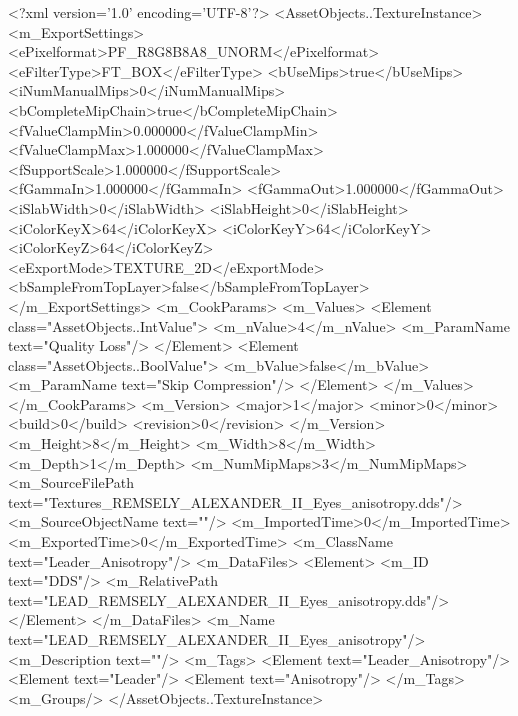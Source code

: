 <?xml version='1.0' encoding='UTF-8'?>
<AssetObjects..TextureInstance>
  <m_ExportSettings>
    <ePixelformat>PF_R8G8B8A8_UNORM</ePixelformat>
    <eFilterType>FT_BOX</eFilterType>
    <bUseMips>true</bUseMips>
    <iNumManualMips>0</iNumManualMips>
    <bCompleteMipChain>true</bCompleteMipChain>
    <fValueClampMin>0.000000</fValueClampMin>
    <fValueClampMax>1.000000</fValueClampMax>
    <fSupportScale>1.000000</fSupportScale>
    <fGammaIn>1.000000</fGammaIn>
    <fGammaOut>1.000000</fGammaOut>
    <iSlabWidth>0</iSlabWidth>
    <iSlabHeight>0</iSlabHeight>
    <iColorKeyX>64</iColorKeyX>
    <iColorKeyY>64</iColorKeyY>
    <iColorKeyZ>64</iColorKeyZ>
    <eExportMode>TEXTURE_2D</eExportMode>
    <bSampleFromTopLayer>false</bSampleFromTopLayer>
  </m_ExportSettings>
  <m_CookParams>
    <m_Values>
      <Element class="AssetObjects..IntValue">
        <m_nValue>4</m_nValue>
        <m_ParamName text="Quality Loss"/>
      </Element>
      <Element class="AssetObjects..BoolValue">
        <m_bValue>false</m_bValue>
        <m_ParamName text="Skip Compression"/>
      </Element>
    </m_Values>
  </m_CookParams>
  <m_Version>
    <major>1</major>
    <minor>0</minor>
    <build>0</build>
    <revision>0</revision>
  </m_Version>
  <m_Height>8</m_Height>
  <m_Width>8</m_Width>
  <m_Depth>1</m_Depth>
  <m_NumMipMaps>3</m_NumMipMaps>
  <m_SourceFilePath text="Textures\LEAD_REMSELY_ALEXANDER_II_Eyes_anisotropy.dds"/>
  <m_SourceObjectName text=""/>
  <m_ImportedTime>0</m_ImportedTime>
  <m_ExportedTime>0</m_ExportedTime>
  <m_ClassName text="Leader_Anisotropy"/>
  <m_DataFiles>
    <Element>
      <m_ID text="DDS"/>
      <m_RelativePath text="LEAD_REMSELY_ALEXANDER_II_Eyes_anisotropy.dds"/>
    </Element>
  </m_DataFiles>
  <m_Name text="LEAD_REMSELY_ALEXANDER_II_Eyes_anisotropy"/>
  <m_Description text=""/>
  <m_Tags>
    <Element text="Leader_Anisotropy"/>
    <Element text="Leader"/>
    <Element text="Anisotropy"/>
  </m_Tags>
  <m_Groups/>
</AssetObjects..TextureInstance>
